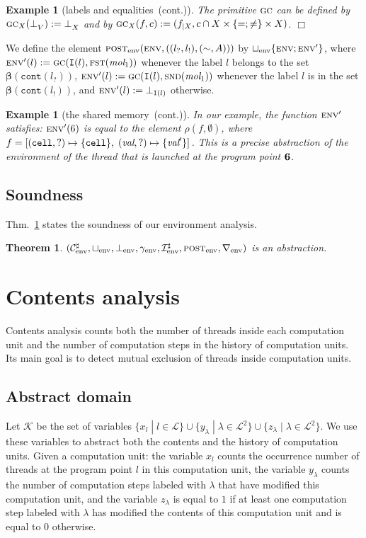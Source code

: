 \documentclass{article}
\newcommand{\bydef}{:=}
\newcommand{\boxexample}{$\Box$}
\newtheorem{example}[thm]{Example}
\newtheorem{theorem}[thm]{Theorem}
\newcommand{\Labels}{\mathcal{L}}
\newcommand{\rec}{?}
\newcommand{\eme}{!}
\newcommand{\pp}[1]{$\bf{#1}$}
\newcommand{\internal}[1]{\textnormal{\texttt{#1}}}
\newcommand{\variable}[1]{\textit{#1}}
\newcommand{\ccell}{\internal{cell}}
\newcommand{\datawrite}{\variable{val}'}
\newcommand{\dataread}{\variable{val}}
\newcommand{\memlabf}{6}
\newcommand{\prolabel}{\Labels}
\newcommand{\interface}{\mathtt{I}}
\newcommand{\Extract}{\mathbf{\beta}}
\newcommand{\cont}{\texttt{cont}}
\newcommand{\lrec}{l_{\rec}}
\newcommand{\leme}{l_{\eme}}
\newcommand{\continued}{(cont.)}
\newcommand{\abst}[1]{\textsc{post}_{#1}}
\newcommand{\aunion}[1]{\sqcup_{#1}}
\newcommand{\adom}[1]{\mathcal{C}_{#1}^{\sharp}}
\newcommand{\abot}[1]{\bot_{#1}}
\newcommand{\conc}[1]{\gamma_{#1}}
\newcommand{\ainit}[1]{\mathcal{I}_{#1}^{\sharp}}
\newcommand{\wid}[1]{\nabla_{#1}}
\newcommand{\tuple}[1]{(\adom{#1},
                        \aunion{#1},
                        \abot{#1},\conc{#1},
                        \ainit{#1},
                        \abst{#1},
                        \wid{#1})}
\newcommand{\envf}{\textsc{env}}
\newcommand{\Atomeshortkey}{}
\newcommand{\botatome}[1]{\bot^{\Atomeshortkey}_{#1}}
\newcommand{\Envkey}{\mathrm{env}}
\newcommand{\cupenv}{\sqcup_{\Envkey}}
\newcommand{\jgc}{\textsc{gc}}
\newcommand{\gc}[2]{\jgc(#1,#2)}
\newcommand{\fst}{\textsc{fst}}
\newcommand{\snd}{\textsc{snd}}
\newcommand{\cfadomain}{labels and equalities}
\newcommand{\ccfadomain}{\cfadomain\ \continued}
\newcommand{\shareanalysis}{the shared memory}
\newcommand{\cflowanalysis}{\shareanalysis\ \continued}
\newcommand{\var}{\mathcal{K}}
\begin{document}
\begin{example}[\ccfadomain]
The primitive $\jgc$ can be defined by  $\jgc_X(\botatome{V})\bydef\botatome{X}$ and  by $\jgc_X(f,c)\bydef(f_{|X},c\cap X\times\{=;\not=\}\times X)$.
\boxexample\end{example}

We define the element $\abst{\Envkey}(\envf,((\lrec,\leme),(\sim,A)))$  by $\cupenv \{\envf;\envf'\}$, where $\envf'(l)\bydef \gc{\interface(l)}{\fst(\textit{mol}_1)}$ whenever the label $l$ belongs to  the set $\Extract(\cont(\lrec))$, 
 $\envf'(l)\bydef \gc{\interface(l)}{\snd(\textit{mol}_1)}$ whenever 
the label $l$ is in the set $\Extract(\cont(\leme))$, 
and  $\envf'(l)\bydef\bot_{\interface(l)}$ otherwise.

\begin{example}[\cflowanalysis]
In our example, the function $\envf'$ satisfies: $\envf'(\memlabf)$  is equal to the element $\rho(f,\emptyset)$, where $f= [(\ccell,\rec) \mapsto \{\ccell\},\;(\dataread,\rec) \mapsto \{\datawrite\}]$. This is a precise abstraction of the environment of the thread that is launched at the program point \pp{\memlabf}.
\end{example}

\subsection{Soundness}

Thm.~\ref{envsound} states the soundness of our environment analysis.
\begin{theorem}
\label{envsound}$\tuple{\Envkey}$ is an abstraction.
\end{theorem}



\section{Contents  analysis}
\label{occurrence}


Contents analysis counts both the number of threads inside each computation unit and the number of computation steps in the history of computation units. 
Its main goal is to detect mutual exclusion of threads inside computation units.

\subsection{Abstract domain}
Let $\var$ be the  set of variables $\{x_l\;|\;l\in \prolabel\}\cup
\{y_\lambda\;|\;\lambda\in \prolabel^2\}\cup \{z_\lambda\;|\;\lambda\in\prolabel^2\}$.
We use these variables to abstract both the contents and the history of computation units.
Given a computation unit: the variable $x_l$ counts the occurrence number of threads at the program point  $l$ in this computation unit,
 the variable $y_\lambda$ counts the number of computation steps labeled with $\lambda$ that have modified this computation unit, and the variable $z_\lambda$ is equal to $1$ if at least one computation step labeled with $\lambda$ has modified the contents of this computation unit and  is equal to $0$ otherwise.
\end{document}
